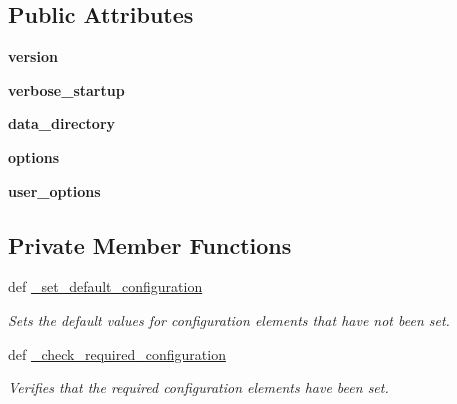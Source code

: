 \subsection*{Public Attributes}
\begin{DoxyCompactItemize}
\item 
\hypertarget{classhwm_1_1core_1_1configuration_1_1_config_a427c9c68035e6d28a05f255593de86aa}{{\bfseries version}}\label{classhwm_1_1core_1_1configuration_1_1_config_a427c9c68035e6d28a05f255593de86aa}

\item 
\hypertarget{classhwm_1_1core_1_1configuration_1_1_config_a0fe0c0b9d227f184980e77d7d0854edc}{{\bfseries verbose\-\_\-startup}}\label{classhwm_1_1core_1_1configuration_1_1_config_a0fe0c0b9d227f184980e77d7d0854edc}

\item 
\hypertarget{classhwm_1_1core_1_1configuration_1_1_config_affca9301b207c467333b9d8b53e63da1}{{\bfseries data\-\_\-directory}}\label{classhwm_1_1core_1_1configuration_1_1_config_affca9301b207c467333b9d8b53e63da1}

\item 
\hypertarget{classhwm_1_1core_1_1configuration_1_1_config_ac08fab7b96bd0ff4f31b3b357b281dda}{{\bfseries options}}\label{classhwm_1_1core_1_1configuration_1_1_config_ac08fab7b96bd0ff4f31b3b357b281dda}

\item 
\hypertarget{classhwm_1_1core_1_1configuration_1_1_config_a76b155d8d10ead2dc5a90fc602a33ffb}{{\bfseries user\-\_\-options}}\label{classhwm_1_1core_1_1configuration_1_1_config_a76b155d8d10ead2dc5a90fc602a33ffb}

\end{DoxyCompactItemize}
\subsection*{Private Member Functions}
\begin{DoxyCompactItemize}
\item 
def \hyperlink{classhwm_1_1core_1_1configuration_1_1_config_af270a1b7fcd55ca884587e9e19411813}{\-\_\-set\-\_\-default\-\_\-configuration}
\begin{DoxyCompactList}\small\item\em Sets the default values for configuration elements that have not been set. \end{DoxyCompactList}\item 
def \hyperlink{classhwm_1_1core_1_1configuration_1_1_config_a95235089ef316715ed60938ebb262fd4}{\-\_\-check\-\_\-required\-\_\-configuration}
\begin{DoxyCompactList}\small\item\em Verifies that the required configuration elements have been set. \end{DoxyCompactList}\end{DoxyCompactItemize}


